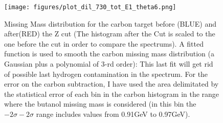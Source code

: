 \begin{figure}[htb]
  \begin{center}
    \texttt{[image: figures/plot\_dil\_730\_tot\_E1\_theta6.png]} \\
    \caption{Missing Mass distribution for the carbon target before (BLUE) and after(RED) the Z cut (The histogram after the Cut is scaled to the one before the cut in order to compare the spectrums). A fitted function is used to smooth the carbon missing mass distribution (a Gaussian plus a polynomial of 3-rd order): This last fit will get rid of possible last hydrogen contamination in the spectrum. For the error on the carbon subtraction, I have used the area delimitated by the statistical error of each bin in the carbon histogram in the range where the butanol missing mass is considered (in this bin the $-2\sigma - 2\sigma$ range includes values from 0.91GeV to 0.97GeV).}
    \label{fig:dilution_mass_zcut}
  \end{center}
\end{figure}


